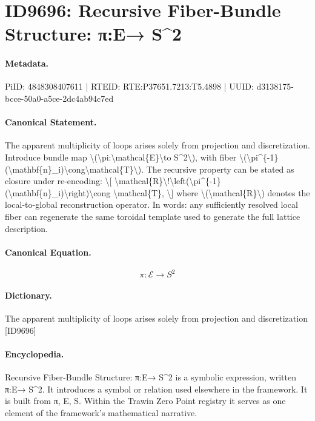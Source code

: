 \section*{ID9696: Recursive Fiber-Bundle Structure: π:E→ S\textasciicircum{}2}
\paragraph{Metadata.}
PiID: 4848308407611 | RTEID: RTE:P37651.7213:T5.4898 | UUID: d3138175-bcce-50a0-a5ce-2dc4ab94c7ed

\paragraph{Canonical Statement.}
The apparent multiplicity of loops arises solely from projection and discretization. Introduce bundle map \textbackslash{}(\textbackslash{}pi:\textbackslash{}mathcal\{E\}\textbackslash{}to S\textasciicircum{}2\textbackslash{}), with fiber \textbackslash{}(\textbackslash{}pi\textasciicircum{}\{-1\}(\textbackslash{}mathbf\{n\}\_i)\textbackslash{}cong\textbackslash{}mathcal\{T\}\textbackslash{}). The recursive property can be stated as closure under re-encoding: \textbackslash{}[ \textbackslash{}mathcal\{R\}\textbackslash{}!\textbackslash{}left(\textbackslash{}pi\textasciicircum{}\{-1\}(\textbackslash{}mathbf\{n\}\_i)\textbackslash{}right)\textbackslash{}cong \textbackslash{}mathcal\{T\}, \textbackslash{}] where \textbackslash{}(\textbackslash{}mathcal\{R\}\textbackslash{}) denotes the local-to-global reconstruction operator. In words: any sufficiently resolved local fiber can regenerate the same toroidal template used to generate the full lattice description.

\paragraph{Canonical Equation.}
\[
\pi:\mathcal{E}\to S^2
\]

\paragraph{Dictionary.}
The apparent multiplicity of loops arises solely from projection and discretization [ID9696]

\paragraph{Encyclopedia.}
Recursive Fiber-Bundle Structure: π:E→ S\textasciicircum{}2 is a symbolic expression, written π:E→ S\textasciicircum{}2. It introduces a symbol or relation used elsewhere in the framework. It is built from π, E, S. Within the Trawin Zero Point registry it serves as one element of the framework's mathematical narrative.
